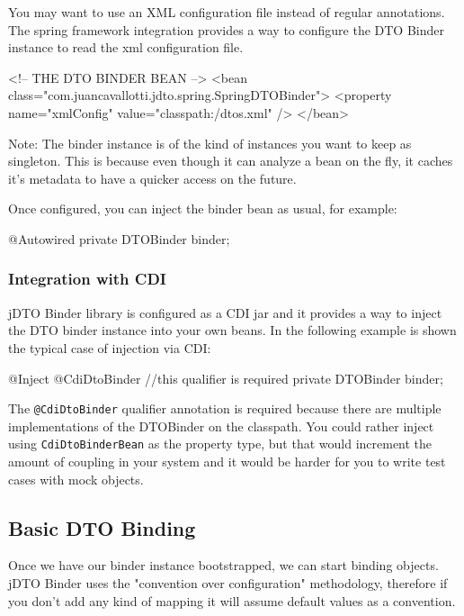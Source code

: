 \documentclass[11pt]{article}
\newcommand{\JDTO}{jDTO Binder\xspace}
\begin{document}
You may want to use an XML configuration file instead of regular annotations. The spring framework integration
provides a way to configure the DTO Binder instance to read the xml configuration file.


\begin{xml}
<!-- THE DTO BINDER BEAN --> 
<bean class="com.juancavallotti.jdto.spring.SpringDTOBinder">
    <property name="xmlConfig" value="classpath:/dtos.xml" />
</bean>
\end{xml}


Note: The binder instance is of the kind of instances you want to keep as singleton. This is because even though it can analyze a bean on the fly, it caches it's metadata to have a quicker access on the future.

Once configured, you can inject the binder bean as usual, for example:


\begin{java}
@Autowired
private DTOBinder binder;
\end{java}

\subsubsection{Integration with CDI}

\JDTO library is configured as a CDI jar and it provides a way to inject the DTO binder instance into your own beans. In the following example is shown the typical case of injection via CDI:


\begin{java}
@Inject
@CdiDtoBinder //this qualifier is required
private DTOBinder binder;
\end{java}

The \texttt{@CdiDtoBinder} qualifier annotation is required because there are multiple implementations of the DTOBinder on the classpath. You could rather inject using \texttt{CdiDtoBinderBean} as the property type, but that would increment the amount of coupling in your system and it would be harder for you to write test cases with mock objects.

\subsection{Basic DTO Binding}


Once we have our binder instance bootstrapped, we can start binding objects. \JDTO uses the "convention over configuration"
methodology, therefore if you don't add any kind of mapping it will assume default values as a convention. 
\end{document}
